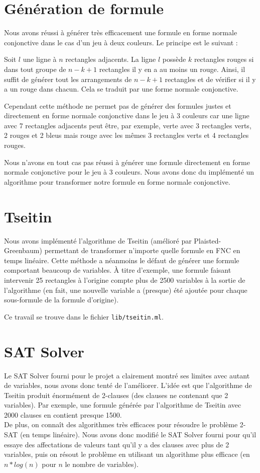 \documentclass[10pt,a4paper]{article}
\begin{document}
\section{Génération de formule}

Nous avons réussi à générer très efficacement une formule en forme normale conjonctive dans le cas d'un jeu à deux couleurs. Le principe est le suivant :

Soit $l$ une ligne à $n$ rectangles adjacents. La ligne $l$ possède $k$ rectangles rouges si dans tout groupe de $n-k+1$ rectangles il y en a au moins un rouge. Ainsi, il suffit de générer tout les arrangements de $n-k+1$ rectangles et de vérifier si il y a un rouge dans chacun. Cela se traduit par une forme normale conjonctive.

Cependant cette méthode ne permet pas de générer des formules justes et directement en forme normale conjonctive dans le jeu à 3 couleurs car une ligne avec 7 rectangles adjacents peut être, par exemple, verte avec 3 rectangles verts, 2 rouges et 2 bleus mais rouge avec les mêmes 3 rectangles verts et 4 rectangles rouges.

Nous n'avons en tout cas pas réussi à générer une formule directement en forme normale conjonctive pour le jeu à 3 couleurs. Nous avons donc du implémenté un algorithme pour transformer notre formule en forme normale conjonctive.


\section{Tseitin}
Nous avons implémenté l'algorithme de Tseitin (amélioré par Plaisted-Greenbaum) permettant de transformer n'importe quelle formule en FNC en temps linéaire.
Cette méthode a néanmoins le défaut de générer une formule comportant beaucoup de variables. À titre d'exemple, une formule faisant intervenir 25 rectangles à l'origine compte plus de 2500 variables à la sortie de l'algorithme (en fait, une nouvelle variable a (presque) été ajoutée pour chaque sous-formule de la formule d'origine).

Ce travail se trouve dans le fichier \verb|lib/tseitin.ml|.

\section{SAT Solver}
Le SAT Solver fourni pour le projet a clairement montré ses limites avec autant de variables, nous avons donc tenté de l'améliorer. L'idée est que l'algorithme de Tseitin produit énormément de 2-clauses (des clauses ne contenant que 2 variables). Par exemple, une formule générée par l'algorithme de Tseitin avec 2000 clauses en contient presque 1500.\\
De plus, on connaît des algorithmes très efficaces pour résoudre le problème 2-SAT (en temps linéaire). Nous avons donc modifié le SAT Solver fourni pour qu'il essaye des affectations de valeurs tant qu'il y a des clauses avec plus de 2 variables, puis on résout le problème en utilisant un algorithme plus efficace (en $n*log(n)$ pour $n$ le nombre de variables).
\end{document}
